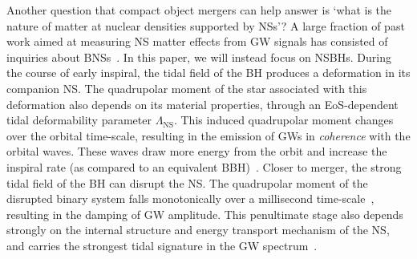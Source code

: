 \documentclass[aps,prd,amsmath,floats,floatfix, twocolumn,
superscriptaddress,nofootinbib,showpacs]{revtex4-1}
\newcommand{\lambdans}{\Lambda_\mathrm{NS}}
\begin{document}
Another question that compact object mergers can help answer is `what is the 
nature of matter at nuclear densities supported by NSs'?
A large fraction of past work aimed at measuring NS matter effects from GW
signals has consisted of inquiries about BNSs~\cite{Lee1999a,Lee1999b,Lee2000,
oechslin:07,Read:2008iy,Markakis:2010mp,Markakis:2011vd,stergioulas:11,
East:2011xa,Lackey2014,Wade:2014vqa,Bauswein:2014qla}. In this paper, we will
instead focus on NSBHs.
% 
During the course of early inspiral, the tidal field of the BH produces a
deformation in its companion NS. The quadrupolar moment of the star associated
with this deformation also depends on its material properties, through an EoS-dependent
tidal deformability parameter $\lambdans$. This induced quadrupolar moment
changes over the orbital time-scale, resulting in the emission of GWs in {\it
coherence} with the orbital waves.
These waves draw more energy from the orbit and increase the inspiral rate (as
compared to an equivalent BBH)~\cite{Flanagan2008}.
% 
Closer to merger, the strong tidal field of the BH can disrupt the NS. The
quadrupolar moment of the disrupted binary system falls monotonically over a
millisecond time-scale~\cite{Kyutoku:2010zd,Lackey:2013axa,Lovelace:2013vma,
Foucart:2015a,Pannarale:2015jia}, resulting in the damping of GW amplitude.
% 
This penultimate stage also depends strongly on the internal structure and energy
transport mechanism of the NS, and carries the strongest tidal signature in the
GW spectrum~\cite{Foucart:2014nda,Deaton2013}.

\end{document}
